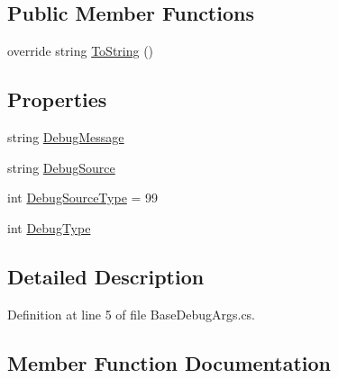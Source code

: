 \subsection*{Public Member Functions}
\begin{DoxyCompactItemize}
\item 
override string \mbox{\hyperlink{class_little_weeb_library_1_1_event_arguments_1_1_base_debug_args_abd45b6cc151692d7c3878ea3c2c61d88}{To\+String}} ()
\end{DoxyCompactItemize}
\subsection*{Properties}
\begin{DoxyCompactItemize}
\item 
string \mbox{\hyperlink{class_little_weeb_library_1_1_event_arguments_1_1_base_debug_args_ab2d00faa48751515043b173742b84857}{Debug\+Message}}
\item 
string \mbox{\hyperlink{class_little_weeb_library_1_1_event_arguments_1_1_base_debug_args_a13caf826c18316458f6cc474853dc774}{Debug\+Source}}
\item 
int \mbox{\hyperlink{class_little_weeb_library_1_1_event_arguments_1_1_base_debug_args_a95613b85e457ccb3bc214489b5cdcb01}{Debug\+Source\+Type}} = 99
\item 
int \mbox{\hyperlink{class_little_weeb_library_1_1_event_arguments_1_1_base_debug_args_aa2822d085deabfeb175824f22a114f1f}{Debug\+Type}}
\end{DoxyCompactItemize}


\subsection{Detailed Description}


Definition at line 5 of file Base\+Debug\+Args.\+cs.



\subsection{Member Function Documentation}
\mbox{\label{class_little_weeb_library_1_1_event_arguments_1_1_base_debug_args_abd45b6cc151692d7c3878ea3c2c61d88}} 
